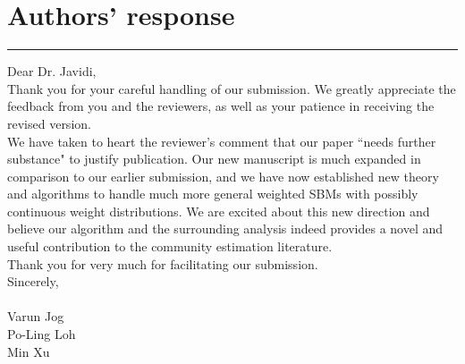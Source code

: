 \documentclass[12pt]{article} %
\theoremstyle{plain}
\theoremstyle{remark}
\theoremstyle{definition}
\begin{document}
\section*{Authors' response}
\vspace{-3mm}
{\rule{\linewidth}{.5mm}}
\vspace{1mm}
Dear Dr. Javidi,\\

\noindent Thank you for your careful handling of our submission. We greatly appreciate the feedback from you and the reviewers, as well as your patience in receiving the revised version. \\

\noindent We have taken to heart the reviewer's comment that our paper ``needs further substance" to justify publication. Our new manuscript is much expanded in comparison to our earlier submission, and we have now established new theory and algorithms to handle much more general weighted SBMs with possibly continuous weight distributions. We are excited about this new direction and believe our algorithm and the surrounding analysis indeed provides a novel and useful contribution to the community estimation literature. \\

\noindent Thank you for very much for facilitating our submission.\\

\noindent Sincerely, \\
\vspace{1mm} \\
Varun Jog \\
Po-Ling Loh \\
Min Xu

 
\end{document}
